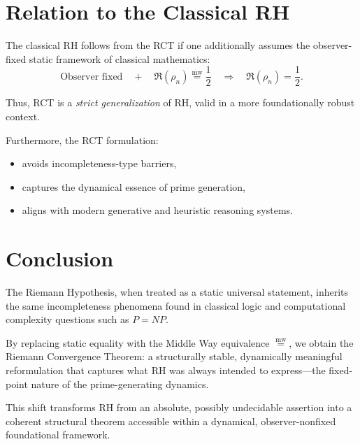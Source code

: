 \documentclass[12pt]{article}
\newcommand{\mweq}{\mathrel{\overset{\mathrm{mw}}{=}}}
\begin{document}
\section{Relation to the Classical RH}

The classical RH follows from the RCT if one additionally assumes the 
observer-fixed static framework of classical mathematics:
\[
\text{Observer fixed} \quad + \quad \Re(\rho_n) \mweq \frac{1}{2}
\quad \Rightarrow \quad
\Re(\rho_n)=\frac{1}{2}.
\]

Thus, RCT is a \emph{strict generalization} of RH, valid in a more 
foundationally robust context.

Furthermore, the RCT formulation:
\begin{itemize}
    \item avoids incompleteness-type barriers,
    \item captures the dynamical essence of prime generation,
    \item aligns with modern generative and heuristic reasoning systems.
\end{itemize}

\section{Conclusion}

The Riemann Hypothesis, when treated as a static universal statement,
inherits the same incompleteness phenomena found in classical logic and
computational complexity questions such as $P=NP$.

By replacing static equality with the Middle Way equivalence $\mweq$,
we obtain the Riemann Convergence Theorem:
a structurally stable, dynamically meaningful reformulation that captures
what RH was always intended to express---the fixed-point nature of the 
prime-generating dynamics.

This shift transforms RH from an absolute, possibly undecidable assertion
into a coherent structural theorem accessible within a dynamical,
observer-nonfixed foundational framework.
\end{document}
